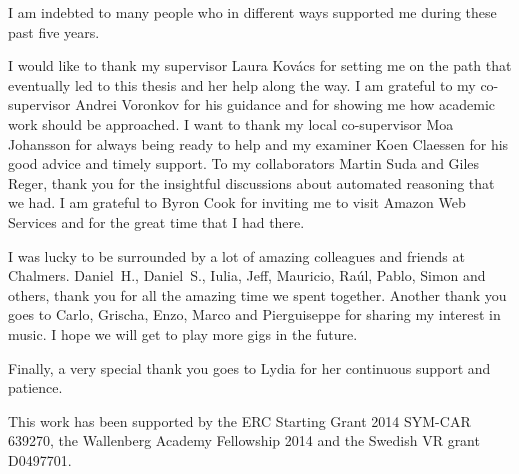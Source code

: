 I am indebted to many people who in different ways supported me during these past five years.

I would like to thank my supervisor Laura Kov\'acs for setting me on the path that eventually led to this thesis and her help along the way. I am grateful to my co-supervisor Andrei Voronkov for his guidance and for showing me how academic work should be approached. I want to thank my local co-supervisor Moa Johansson for always being ready to help and my examiner Koen Claessen for his good advice and timely support. To my collaborators Martin Suda and Giles Reger, thank you for the insightful discussions about automated reasoning that we had. I am grateful to Byron Cook for inviting me to visit Amazon Web Services and for the great time that I had there.

I was lucky to be surrounded by a lot of amazing colleagues and friends at Chalmers. Daniel~H., Daniel~S., Iulia, Jeff, Mauricio, Ra\'ul, Pablo, Simon and others, thank you for all the amazing time we spent together. Another thank you goes to Carlo, Grischa, Enzo, Marco and Pierguiseppe for sharing my interest in music. I hope we will get to play more gigs in the future.

Finally, a very special thank you goes to Lydia for her continuous support and patience.

\vfill

\noindent This work has been supported by the ERC Starting Grant 2014 SYM-CAR 639270, the Wallenberg Academy Fellowship 2014 and the Swedish VR grant D0497701.